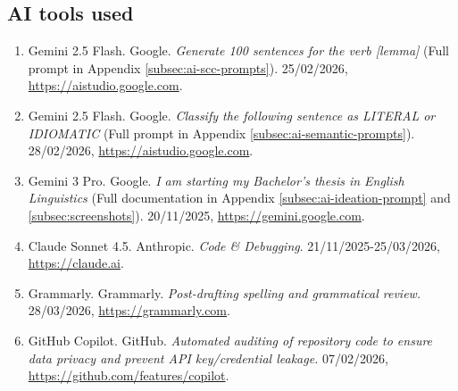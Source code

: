\documentclass[11pt,a4paper]{article}
\begin{document}
\begin{table}[htbp]
\centering
\caption[AI Tools Used]{Table documenting AI tools used}
\label{tab:ai-tools-used}
\setlength{\tabcolsep}{7pt}
\renewcommand{\arraystretch}{1.2}
\end{table}

\subsection*{AI tools used}
\begin{enumerate}
    \item Gemini 2.5 Flash. Google. \textit{Generate 100 sentences for the verb [lemma]} (Full prompt in Appendix \ref{subsec:ai-scc-prompts}). 25/02/2026, \url{https://aistudio.google.com}.
    \item Gemini 2.5 Flash. Google. \textit{Classify the following sentence as LITERAL or IDIOMATIC} (Full prompt in Appendix \ref{subsec:ai-semantic-prompts}). 28/02/2026, \url{https://aistudio.google.com}.
    \item Gemini 3 Pro. Google. \textit{I am starting my Bachelor's thesis in English Linguistics} (Full documentation in Appendix \ref{subsec:ai-ideation-prompt} and \ref{subsec:screenshots}). 20/11/2025, \url{https://gemini.google.com}.
    \item Claude Sonnet 4.5. Anthropic. \textit{Code \& Debugging}. 21/11/2025-25/03/2026, \url{https://claude.ai}.
    \item Grammarly. Grammarly. \textit{Post-drafting spelling and grammatical review.} 28/03/2026, \url{https://grammarly.com}.
    \item GitHub Copilot. GitHub. \textit{Automated auditing of repository code to ensure data privacy and prevent API key/credential leakage.} 07/02/2026, \url{https://github.com/features/copilot}.
\end{enumerate}
\end{document}
